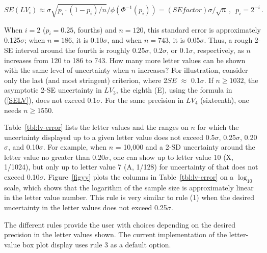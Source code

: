 \documentclass[oneside]{article}
\begin{document}
\begin{equation}
SE(LV_i) \approx \sigma \sqrt{p_i \cdot (1 - p_i)/ n} / \phi(\Phi^{-1}(p_i)) 
 = (SEfactor) \sigma / \sqrt{n} \, ,
 \, \, \, p_i = 2^{-i} \, .
\label{SELV}
\end{equation}

\noindent When $i = 2$ ($p_i = 0.25$, fourths) and $n = 120$, this standard error is approximately 0.125$\sigma$; when $n = 186$, it is 0.10$\sigma$, and when $n = 743$, it is 0.05$\sigma$. Thus, a rough 2-SE interval around the fourth is roughly 0.25$\sigma$, 0.2$\sigma$, or 0.1$\sigma$, respectively, as $n$ increases from 120 to 186 to 743. How many more letter values can be shown with the same level of uncertainty when $n$ increases? For illustration, consider only the last (and most stringent) criterion, where 2$SE$ $\approx$ 0.1$\sigma$. If $n \geq 1032$, the asymptotic 2-SE uncertainty in $LV_3$, the eighth (E), using the formula in (\ref{SELV}), does not exceed 0.1$\sigma$. For the same precision in $LV_4$ (sixteenth), one needs $n \geq 1550$.

Table~\ref{tbl:lv-error} lists the letter values and the ranges on $n$ for which the uncertainty displayed up to a given letter value does not exceed 0.5$\sigma$, 0.25$\sigma$, 0.20$\sigma$, and 0.10$\sigma$. For example, when $n$ = 10,000 and a 2-SD uncertainty around the letter value no greater than 0.20$\sigma$, one can show up to letter value 10 (X, 1/1024), but only up to letter value 7 (A, 1/128) for uncertainty of that does not exceed 0.10$\sigma$. Figure~\ref{figyy} plots the columns in Table~\ref{tbl:lv-error} on a $\log_10$ scale, which shows that the logarithm of the sample size is approximately linear in the letter value number. This rule is very similar to rule (1) when the desired uncertainty in the letter values does not exceed 0.25$\sigma$.

The different rules provide the user with choices depending on the desired precision in the letter values shown. The current implementation of the letter-value box plot display uses rule 3 as a default option.
\end{document}
